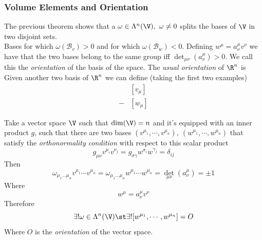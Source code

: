 \documentclass[../mmf.tex]{subfiles}
\begin{document}
\subsubsection{Volume Elements and Orientation}
\begin{dfn}[Orientation]
	The previous theorem shows that a $\omega\in\Lambda^n(\V),\ \omega\ne0$ splits the bases of $\V$ in two disjoint sets.\\
	Bases for which $\omega(\mathcal{B}_v)>0$ and for which $\omega(\mathcal{B}_w)<0$. Defining $w^{\mu}=a^\mu_\nu v^\nu$ we have that the two bases belong to the same group iff $\det_{\mu\nu}(a^\mu_\nu)>0$. We call this the \textit{orientation} of the basis of the space. The \textit{usual orientation} of $\R^n$ is
	\begin{equation*}
		[e_\mu]
	\end{equation*}
	Given another two basis of $\R^n$ we can define (taking the first two examples)
	\begin{equation*}
		\begin{aligned}
			&[v_\mu]\\
			-&[w_\mu]
		\end{aligned}
	\end{equation*}
\end{dfn}
\begin{dfn}
	Take a vector space $\V$ such that $\dim(\V)=n$ and it's equipped with an inner product $g$, such that there are two bases $(v^{\mu_1},\cdots,v^{\mu_n}),\ (w^{\mu_1},\cdots,w^{\mu_n})$ that satisfy the \textit{orthonormality condition} with respect to this scalar product
	\begin{equation}
		g_{\mu\nu}v^{\mu_i} v^{\nu_j}=g_{\sigma\gamma}w^{\sigma_i} w^{\gamma_j}=\delta_{ij}
		\label{eq:boncond}
	\end{equation}
	Then
	\begin{equation*}
		\omega_{\mu_1\ldots\mu_n}v^{\mu_1}\cdots v^{\mu_n}=\omega_{\mu_1\ldots\mu_n}w^{\mu_1}\cdots w^{\mu_n}=\det_{\mu\nu}(a^\mu_\nu)=\pm 1
	\end{equation*}
	Where
	\begin{equation*}
		w^\mu=a^\mu_\nu v^\nu
	\end{equation*}
	Therefore
	\begin{equation*}
		\exists!\omega\in\Lambda^n(\V)\st\exists![w^{\mu_1},\cdots,w^{\mu_n}]=O
	\end{equation*}
	Where $O$ is the \textit{orientation} of the vector space.
\end{dfn}
\end{document}
